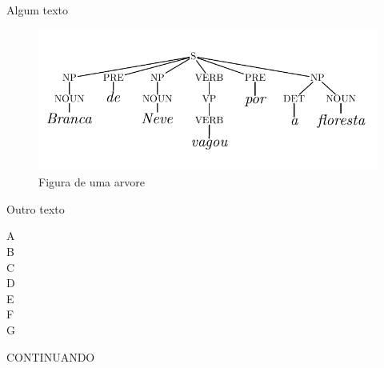 \documentclass[epsfig]{article}
\begin{document}
Algum texto
\begin{figure}
\centering
\includegraphics[scale=0.8]{arvore.pdf}
\caption{Figura de uma arvore}
\end{figure}
Outro texto

\begin{multicols}{3} \noindent
A \\
B \\
C \\
D \\
E \\
F \\
G
\end{multicols}

CONTINUANDO
\end{document}

